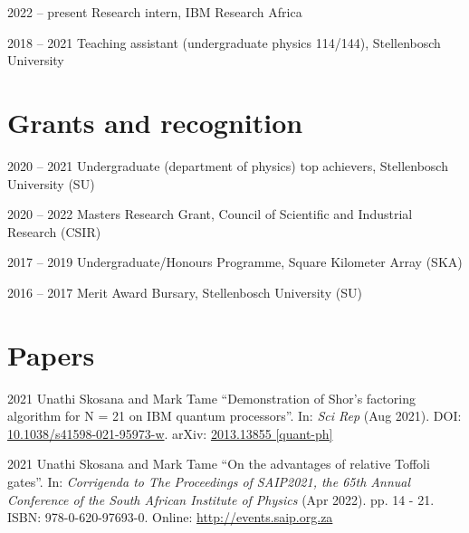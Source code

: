 \documentclass[10pt]{extreport}
\begin{document}
    \begin{tablist}
      \item[2022 -- present]  \tab{} Research intern, IBM Research Africa
      \item[2018 -- 2021] \tab{} Teaching assistant (undergraduate physics 114/144), Stellenbosch University
    \end{tablist}

    \section*{Grants and recognition}

    \begin{tablist}
		  \item[2020 -- 2021] \tab{} Undergraduate (department of physics) top achievers, Stellenbosch University (SU)
		  \item[2020 -- 2022]  \tab{} Masters Research Grant, Council of Scientific and Industrial Research (CSIR)
		  \item[2017 -- 2019]  \tab{} Undergraduate/Honours Programme, Square Kilometer Array (SKA)
		  \item[2016 -- 2017]  \tab{} Merit Award Bursary, Stellenbosch University (SU)
	  \end{tablist}

    \section*{Papers}

    \begin{tablist}
        \item[2021] \tab{}Unathi Skosana and Mark Tame \enquote{Demonstration of Shor’s factoring algorithm for N = 21 on IBM quantum processors}. In: \textit{Sci Rep} (Aug 2021). DOI: \href{https://doi.org/10.1038/s41598-021-95973-w}{10.1038/s41598-021-95973-w}. arXiv: \href{https://arxiv.org/abs/2103.13855}{2013.13855 [quant-ph]}
        \item[2021] \tab{}Unathi Skosana and Mark Tame \enquote{On the advantages of relative
          Toffoli gates}. In: \textit{Corrigenda to The Proceedings of SAIP2021, the 65th  Annual Conference of
          the South African Institute of Physics} (Apr 2022). pp. 14 - 21. ISBN:
          978-0-620-97693-0. Online: \url{http://events.saip.org.za}

    \end{tablist}

    \newpage{}
\end{document}
